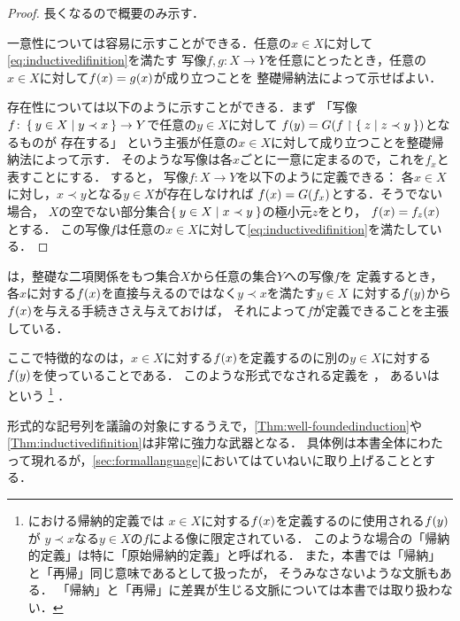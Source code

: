 \begin{proof}
	長くなるので概要のみ示す．

	一意性については容易に示すことができる．任意の\(x \in X\)に対して\cref{eq:inductivedifinition}を満たす
	写像\(f, g \colon X \to Y\)を任意にとったとき，任意の\(x \in X\)に対して\(\apply{f}{x} = \apply{g}{x}\)が成り立つことを
	整礎帰納法によって示せばよい．

	存在性については以下のように示すことができる．まず
	「写像\(f \colon \Set{y \in X | y \prec x} \to Y\)で任意の\(y \in X\)に対して
	\(\apply{f}{y} = \apply{G}{f \restriction \Set{z | z \prec y}}\)となるものが
	存在する」
	という主張が任意の\(x \in X\)に対して成り立つことを整礎帰納法によって示す．
	そのような写像は各\(x\)ごとに一意に定まるので，これを\(f_x\)と表すことにする．
	すると，
	写像\(f \colon X \to Y\)を以下のように定義できる：
	各\(x \in X\)に対し，\(x \prec y\)となる\(y \in X\)が存在しなければ
	\(\apply{f}{x} = \apply{G}{f_x}\)とする．そうでない場合，
	\(X\)の空でない部分集合\(\Set{y \in X | x \prec y}\)の極小元\(z\)をとり，
	\(\apply{f}{x} = \apply{f_z}{x}\)とする．
	この写像\(f\)は任意の\(x \in X\)に対して\cref{eq:inductivedifinition}を満たしている．
\end{proof}

は，整礎な二項関係をもつ集合\(X\)から任意の集合\(Y\)への写像\(f\)を
定義するとき，各\(x\)に対する\(\apply{f}{x}\)を直接与えるのではなく\(y \prec x\)を満たす\(y \in X\)
に対する\(\apply{f}{y}\)から\(\apply{f}{x}\)を与える手続きさえ与えておけば，
それによって\(f\)が定義できることを主張している．

ここで特徴的なのは，\(x \in X\)に対する\(\apply{f}{x}\)を定義するのに別の\(y \in X\)に対する\(\apply{f}{y}\)を使っていることである．
このような形式でなされる定義を%
%
，
あるいは%
%
という%
\footnote{%
	における帰納的定義では
	\(x \in X\)に対する\(\apply{f}{x}\)を定義するのに使用される\(\apply{f}{y}\)が
	\(y \prec x\)なる\(y \in X\)の\(f\)による像に限定されている．
	このような場合の「帰納的定義」は特に「原始帰納的定義」と呼ばれる．
	また，本書では「帰納」と「再帰」同じ意味であるとして扱ったが，
	そうみなさないような文脈もある．
	「帰納」と「再帰」に差異が生じる文脈については本書では取り扱わない．
}%
．

形式的な記号列を議論の対象にするうえで，\cref{Thm:well-foundedinduction}や
\cref{Thm:inductivedifinition}は非常に強力な武器となる．
具体例は本書全体にわたって現れるが，\cref{sec:formallanguage}においてはていねいに取り上げることとする．

